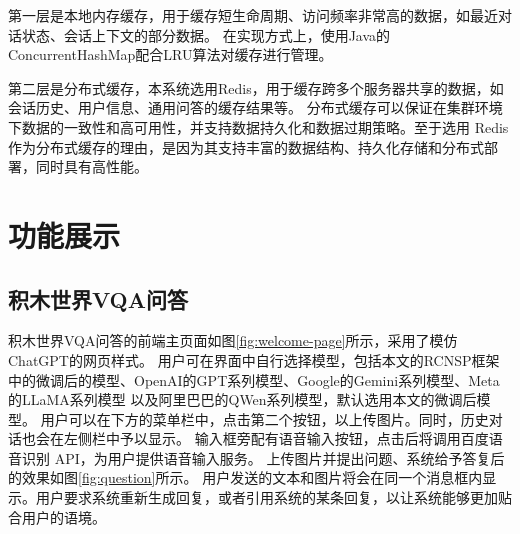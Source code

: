 第一层是本地内存缓存，用于缓存短生命周期、访问频率非常高的数据，如最近对话状态、会话上下文的部分数据。
在实现方式上，使用Java的ConcurrentHashMap配合LRU算法对缓存进行管理。

第二层是分布式缓存，本系统选用Redis，用于缓存跨多个服务器共享的数据，如会话历史、用户信息、通用问答的缓存结果等。
分布式缓存可以保证在集群环境下数据的一致性和高可用性，并支持数据持久化和数据过期策略。至于选用
Redis作为分布式缓存的理由，是因为其支持丰富的数据结构、持久化存储和分布式部署，同时具有高性能。

\section{功能展示}
\subsection{积木世界VQA问答}
积木世界VQA问答的前端主页面如图\ref{fig:welcome-page}所示，采用了模仿ChatGPT的网页样式。
用户可在界面中自行选择模型，包括本文的RCNSP框架中的微调后的模型、OpenAI的GPT系列模型、Google的Gemini系列模型、Meta的LLaMA系列模型
以及阿里巴巴的QWen系列模型，默认选用本文的微调后模型。
用户可以在下方的菜单栏中，点击第二个按钮，以上传图片。同时，历史对话也会在左侧栏中予以显示。
输入框旁配有语音输入按钮，点击后将调用百度语音识别 API，为用户提供语音输入服务。
上传图片并提出问题、系统给予答复后的效果如图\ref{fig:question}所示。
用户发送的文本和图片将会在同一个消息框内显示。用户要求系统重新生成回复，或者引用系统的某条回复，以让系统能够更加贴合用户的语境。


